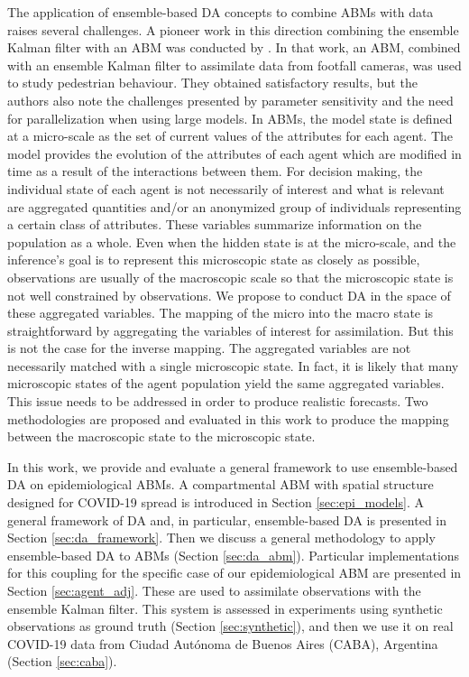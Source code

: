 \documentclass[11pt,a4paper]{article}
\begin{document}
The application of ensemble-based DA concepts to combine ABMs with data  raises several challenges. A pioneer work in this direction combining the ensemble Kalman filter with an ABM  was conducted by \cite{Ward2016}. In that work, an ABM, combined with an ensemble Kalman filter to assimilate data from footfall cameras, was used to study pedestrian behaviour. They obtained satisfactory results, but the authors also note the challenges presented by parameter sensitivity and the need for parallelization when using large models. In ABMs, the model state is defined at a micro-scale as the set of current values of the attributes for each agent. The model provides the evolution of the attributes of each agent which are modified in time as a result of the interactions between them. For decision making, the individual state of each agent is not necessarily of interest and what is relevant are aggregated quantities and/or an anonymized group of individuals representing a certain class of attributes. These variables summarize information on the population as a whole. Even when the hidden state is at the micro-scale, and the inference's goal is to represent this microscopic state as closely as possible, observations are usually of the macroscopic scale so that the microscopic state is not well constrained by observations. We propose to conduct DA in the space of these aggregated variables. The mapping of the micro into the macro state is straightforward by aggregating the variables of interest for assimilation. But this is not the case for the inverse mapping. The aggregated variables are not necessarily matched with a single microscopic state. In fact, it is likely that many microscopic states of the agent population yield the same aggregated variables. This issue needs to be addressed in order to produce realistic forecasts. Two methodologies are proposed and evaluated in this work to produce the mapping between the macroscopic state to the microscopic state.

In this work, we provide and evaluate a general framework to use ensemble-based DA on epidemiological ABMs. A compartmental ABM with spatial structure designed for COVID-19 spread is introduced in Section \ref{sec:epi_models}. A general framework of DA and, in particular, ensemble-based DA is presented in Section \ref{sec:da_framework}. Then we discuss a general methodology to apply ensemble-based DA to ABMs (Section \ref{sec:da_abm}). Particular implementations for this coupling for the specific case of our epidemiological ABM are presented in Section \ref{sec:agent_adj}. These are used to assimilate observations with the ensemble Kalman filter. This system is assessed in experiments using synthetic observations as ground truth (Section \ref{sec:synthetic}), and then we use it on real COVID-19 data from Ciudad Autónoma de Buenos Aires (CABA), Argentina (Section \ref{sec:caba}). 
\end{document}
